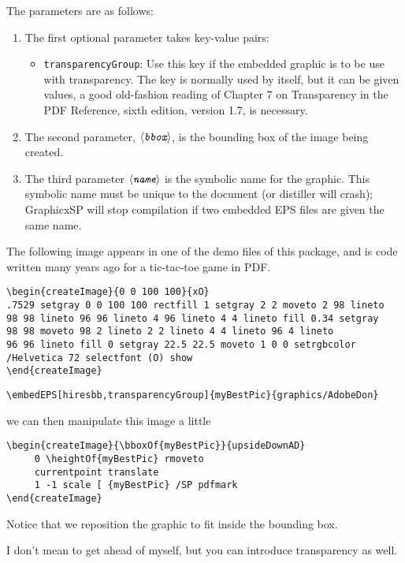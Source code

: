 \documentclass{article}
\def\anglemeta#1{$\langle\textit{\texttt{#1}}\rangle$}
\def\meta#1{\textit{\texttt{#1}}}
\let\meta\anglemeta
\let\pkg\textsf
\begin{document}
\PD The parameters are as follows:
\begin{enumerate}
\item The first optional parameter takes key-value pairs:
\begin{itemize}
    \item \texttt{transparencyGroup}: Use this key if the embedded
        graphic is to be use with transparency. The key is normally
        used by itself, but it can be given values, a good
        old-fashion reading of Chapter 7 on Transparency in the PDF
        Reference, sixth edition, version 1.7, is necessary.
\end{itemize}
\item The second parameter, \meta{bbox}, is the bounding box of the
image being created.
\item The third parameter \meta{name} is the symbolic name for
the graphic. This symbolic name must be unique to the document (or
distiller will crash); \pkg{GraphicxSP} will stop compilation if two
embedded EPS files are given the same name.
\end{enumerate}
The following image appears in one of the demo files of this package, and is code
written many years ago for a tic-tac-toe game in PDF.
\begin{Verbatim}
\begin{createImage}{0 0 100 100}{xO}
.7529 setgray 0 0 100 100 rectfill 1 setgray 2 2 moveto 2 98 lineto
98 98 lineto 96 96 lineto 4 96 lineto 4 4 lineto fill 0.34 setgray
98 98 moveto 98 2 lineto 2 2 lineto 4 4 lineto 96 4 lineto
96 96 lineto fill 0 setgray 22.5 22.5 moveto 1 0 0 setrgbcolor
/Helvetica 72 selectfont (O) show
\end{createImage}
\end{Verbatim}

\begin{Verbatim}
\embedEPS[hiresbb,transparencyGroup]{myBestPic}{graphics/AdobeDon}
\end{Verbatim}
we can then manipulate this image a little
\begin{Verbatim}
\begin{createImage}{\bboxOf{myBestPic}}{upsideDownAD}
     0 \heightOf{myBestPic} rmoveto
     currentpoint translate
     1 -1 scale [ {myBestPic} /SP pdfmark
\end{createImage}
\end{Verbatim}
Notice that we reposition the graphic to fit inside the bounding box.

I don't mean to get ahead of myself, but you can introduce transparency as well.
\end{document}

